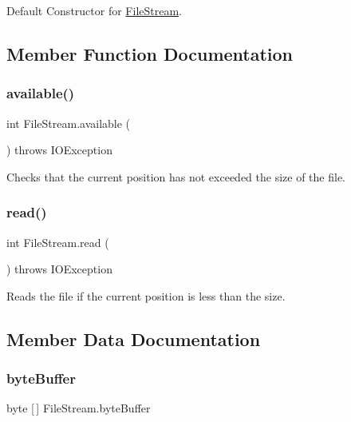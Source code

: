 Default Constructor for \hyperlink{class_file_stream}{File\+Stream}. 



\subsection{Member Function Documentation}
\hypertarget{class_file_stream_a7dd240b96afa9e37f9a6bd8e4b99e48b}{}\label{class_file_stream_a7dd240b96afa9e37f9a6bd8e4b99e48b} 
\subsubsection{\texorpdfstring{available()}{available()}}
{\footnotesize\ttfamily int File\+Stream.\+available (\begin{DoxyParamCaption}{ }\end{DoxyParamCaption}) throws I\+O\+Exception}



Checks that the current position has not exceeded the size of the file. 

\hypertarget{class_file_stream_a7f2ea40eff2241931a4ca971364cd532}{}\label{class_file_stream_a7f2ea40eff2241931a4ca971364cd532} 
\subsubsection{\texorpdfstring{read()}{read()}}
{\footnotesize\ttfamily int File\+Stream.\+read (\begin{DoxyParamCaption}{ }\end{DoxyParamCaption}) throws I\+O\+Exception}



Reads the file if the current position is less than the size. 



\subsection{Member Data Documentation}
\hypertarget{class_file_stream_a3fd85491eb1625e6cd8414c19ee0defa}{}\label{class_file_stream_a3fd85491eb1625e6cd8414c19ee0defa} 
\subsubsection{\texorpdfstring{byte\+Buffer}{byteBuffer}}
{\footnotesize\ttfamily byte \mbox{[}$\,$\mbox{]} File\+Stream.\+byte\+Buffer\hspace{0.3cm}{\ttfamily [private]}}


